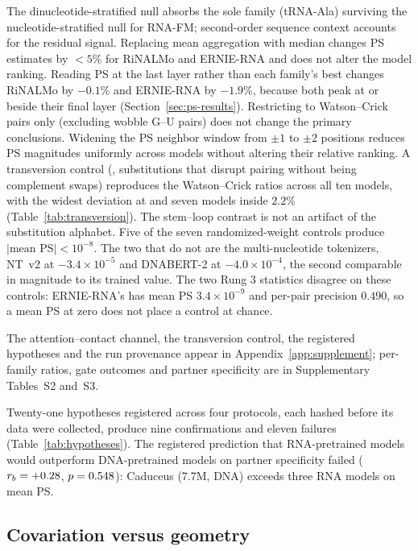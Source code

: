 \documentclass[11pt]{article}
\begin{document}
The dinucleotide-stratified null absorbs the sole family (tRNA-Ala)
surviving the nucleotide-stratified null for RNA-FM; second-order sequence
context accounts for the residual signal. Replacing
mean aggregation with median changes PS estimates by $< 5$\% for RiNALMo
and ERNIE-RNA and does not alter the model ranking. Reading PS at the last
layer rather than each family's best changes RiNALMo by $-0.1$\% and ERNIE-RNA
by $-1.9$\%, because both peak at or beside their final layer
(Section~\ref{sec:ps-results}). Restricting to Watson--Crick pairs only (excluding wobble G--U
pairs) does not change the primary conclusions. Widening the PS neighbor
window from $\pm 1$ to $\pm 2$ positions reduces PS magnitudes uniformly
across models without altering their relative ranking.
A transversion control (\transversionAlphabet{}, substitutions that disrupt
pairing without being complement swaps) reproduces the Watson--Crick ratios
across all ten models, with the widest deviation \transversionWidestDeviation{}
at \transversionWidest{} and seven models inside $2.2$\%
(Table~\ref{tab:transversion}). The stem--loop contrast is not an artifact of
the substitution alphabet. Five of the seven randomized-weight
controls produce $|\text{mean PS}| < 10^{-8}$. The two that do not are the
multi-nucleotide tokenizers, NT~v2 at $-3.4 \times 10^{-5}$ and DNABERT-2 at
$-4.0 \times 10^{-4}$, the second comparable in magnitude to its trained value.
The two Rung 3 statistics disagree on these controls: ERNIE-RNA's has mean PS
$3.4 \times 10^{-9}$ and per-pair precision $0.490$, so a mean PS at zero does
not place a control at chance.

The attention--contact channel, the transversion control, the registered
hypotheses and the run provenance appear in Appendix~\ref{app:supplement};
per-family ratios, gate outcomes and partner specificity are in Supplementary
Tables~S2 and~S3.


Twenty-one hypotheses registered across four protocols, each hashed before its
data were collected, produce nine confirmations and eleven failures
(Table~\ref{tab:hypotheses}). The registered prediction that RNA-pretrained
models would outperform DNA-pretrained models on partner specificity failed
($r_b = +0.28{}$, $p = 0.548{}$): Caduceus (7.7M, DNA) exceeds
three RNA models on mean PS.


\subsection{Covariation versus geometry}
\label{sec:covariation-results}
\end{document}
